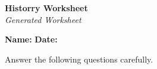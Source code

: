 \documentclass{article}
\begin{document}
\begin{center}
    \Huge \textbf{ Historry Worksheet } \\[0.5cm]
    \large \textit{Generated Worksheet}
\end{center}

\vspace{1cm}

\noindent \textbf{Name:} \underline{\hspace{6cm}} \hfill \textbf{Date:} \underline{\hspace{4cm}}

\vspace{1cm}

Answer the following questions carefully.

\vspace{0.5cm}

\begin{enumerate}

\end{enumerate}
\end{document}
